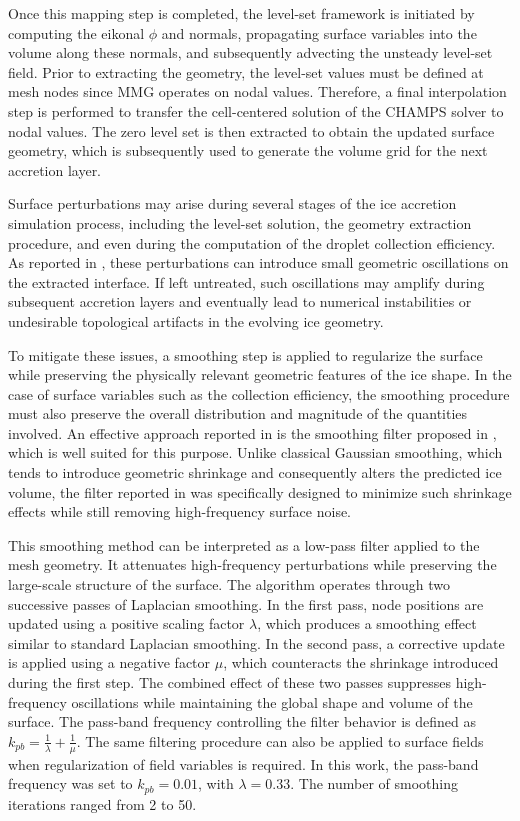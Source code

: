 Once this mapping step is completed, the level-set framework is initiated by computing the eikonal $\phi$ and normals, propagating surface variables into the volume along these normals, and subsequently advecting the unsteady level-set field. Prior to extracting the geometry, the level-set values must be defined at mesh nodes since \textsc{MMG} operates on nodal values. Therefore, a final interpolation step is performed to transfer the cell-centered solution of the CHAMPS solver to nodal values. The zero level set is then extracted to obtain the updated surface geometry, which is subsequently used to generate the volume grid for the next accretion layer.

Surface perturbations may arise during several stages of the ice accretion simulation process, including the level-set solution, the geometry extraction procedure, and even during the computation of the droplet collection efficiency. As reported in \cite{pabloThesis}, these perturbations can introduce small geometric oscillations on the extracted interface. If left untreated, such oscillations may amplify during subsequent accretion layers and eventually lead to numerical instabilities or undesirable topological artifacts in the evolving ice geometry.

To mitigate these issues, a smoothing step is applied to regularize the surface while preserving the physically relevant geometric features of the ice shape. In the case of surface variables such as the collection efficiency, the smoothing procedure must also preserve the overall distribution and magnitude of the quantities involved. An effective approach reported in \cite{pabloThesis} is the smoothing filter proposed in \cite{taubinFilter}, which is well suited for this purpose. Unlike classical Gaussian smoothing, which tends to introduce geometric shrinkage and consequently alters the predicted ice volume, the filter reported in \cite{taubinFilter} was specifically designed to minimize such shrinkage effects while still removing high-frequency surface noise. 

This smoothing method can be interpreted as a low-pass filter applied to the mesh geometry. It attenuates high-frequency perturbations while preserving the large-scale structure of the surface. The algorithm operates through two successive passes of Laplacian smoothing. In the first pass, node positions are updated using a positive scaling factor $\lambda$, which produces a smoothing effect similar to standard Laplacian smoothing. In the second pass, a corrective update is applied using a negative factor $\mu$, which counteracts the shrinkage introduced during the first step. The combined effect of these two passes suppresses high-frequency oscillations while maintaining the global shape and volume of the surface. The pass-band frequency controlling the filter behavior is defined as $k_{pb} = \frac{1}{\lambda} + \frac{1}{\mu}$. The same filtering procedure can also be applied to surface fields when regularization of field variables is required. In this work, the pass-band frequency was set to $k_{pb}=0.01$, with $\lambda=0.33$. The number of smoothing iterations ranged from 2 to 50.

